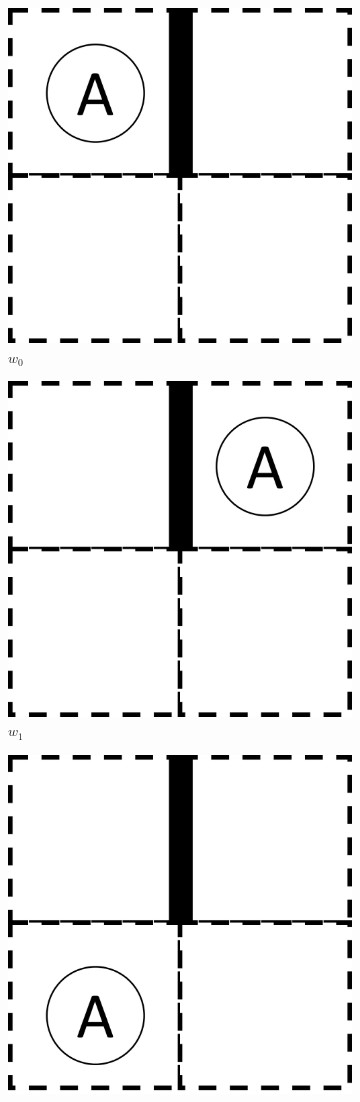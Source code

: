 \begin{figure}[H]
  \centering
    \begin{subfigure}[b]{0.45\linewidth}
        \centering
        \includegraphics[width=0.5\linewidth]{5BeyondSBDRL/GlobalAlgebras/Images/2x2_with_wall_world_states/w0.png}
        \caption{$w_{0}$}
        \vspace{0.25cm}
    \end{subfigure}
    \begin{subfigure}[b]{0.45\linewidth}
        \centering
        \includegraphics[width=0.5\linewidth]{5BeyondSBDRL/GlobalAlgebras/Images/2x2_with_wall_world_states/w1.png}
        \caption{$w_{1}$}
        \vspace{0.25cm}
    \end{subfigure}
    \begin{subfigure}[b]{0.45\linewidth}
        \centering
        \includegraphics[width=0.5\linewidth]{5BeyondSBDRL/GlobalAlgebras/Images/2x2_with_wall_world_states/w2.png}

\end{subfigure}
\end{figure}
